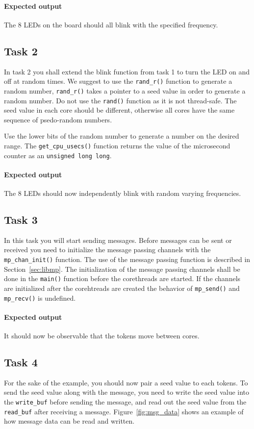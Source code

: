 \documentclass[a4paper,fontsize=10pt,twoside,DIV15,BCOR12mm,headinclude=true,footinclude=false,pagesize,bibtotoc]{scrbook}
\newcommand{\code}[1]{{\texttt{#1}}}
\begin{document}
\paragraph*{Expected output}
The 8 LEDs on the board should all blink with the specified frequency.

\subsection{Task 2}
In task 2 you shall extend the blink function from task 1 to turn the LED on and off at random times.
We suggest to use the \code{rand\_r()} function to generate a random number,
\code{rand\_r()} takes a pointer to a seed value in order to generate a random number.
Do not use the \code{rand()} function as it is not thread-safe.
The seed value in each core should be different, otherwise all cores have the
same sequence of psedo-random numbers.

Use the lower bits of the random number to generate a number on the desired range.
The \code{get\_cpu\_usecs()} function returns the value of the microsecond counter as an \code{unsigned long long}. 

\paragraph*{Expected output}
The 8 LEDs should now independently blink with random varying frequencies.

\subsection{Task 3}
In this task you will start sending messages.
Before messages can be sent or received you need to initialize the message passing channels with the \code{mp\_chan\_init()} function.
The use of the message passing function is described in Section~\ref{sec:libmp}.
The initialization of the message passing channels shall be done in the \code{main()} function before the corethreads are started.
If the channels are initialized after the corehtreads are created the behavior of
\code{mp\_send()} and \code{mp\_recv()} is undefined.


\paragraph*{Expected output}
It should now be observable that the tokens move between cores.

\subsection{Task 4}
For the sake of the example, you should now pair a seed value to each tokens.
To send the seed value along with the message, you need to write the seed value into
the \code{write\_buf} before sending the message, and read out the seed value from the \code{read\_buf}
after receiving a message.
Figure~\ref{fig:msg_data} shows an example of how message data can be read and written.
\end{document}

